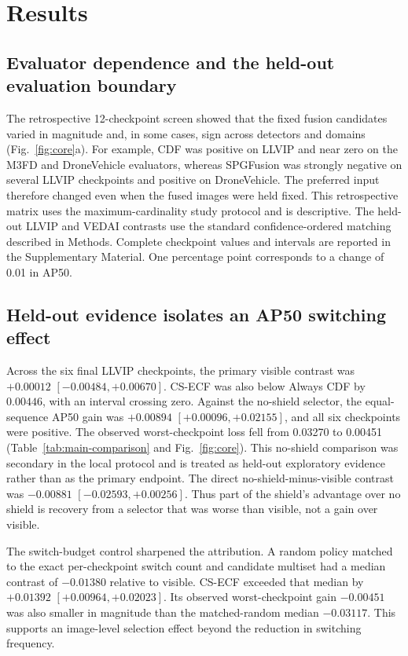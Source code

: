 \section{Results}

\subsection{Evaluator dependence and the held-out evaluation boundary}

The retrospective 12-checkpoint screen showed that the fixed fusion candidates
varied in magnitude and, in some cases, sign across detectors and domains
(Fig.~\ref{fig:core}a). For example, CDF was positive on LLVIP and near zero on
the M3FD and DroneVehicle evaluators, whereas SPGFusion was strongly negative
on several LLVIP checkpoints and positive on DroneVehicle. The preferred input
therefore changed even when the fused images were held fixed. This retrospective
matrix uses the maximum-cardinality study protocol and is descriptive. The
held-out LLVIP and VEDAI contrasts use the standard confidence-ordered matching
described in Methods. Complete checkpoint values and intervals are reported in the
Supplementary Material.
One percentage point corresponds to a change of 0.01 in AP50.

\subsection{Held-out evidence isolates an AP50 switching effect}

Across the six final LLVIP checkpoints, the primary visible contrast was
\(+0.00012\) \([-0.00484,+0.00670]\). CS-ECF was also below Always CDF by
\(0.00446\), with an interval crossing zero. Against the no-shield
selector, the equal-sequence AP50 gain was \(+0.00894\)
\([+0.00096,+0.02155]\), and all six checkpoints were positive. The observed
worst-checkpoint loss fell from 0.03270 to 0.00451
(Table~\ref{tab:main-comparison} and Fig.~\ref{fig:core}).
This no-shield comparison was secondary in the local protocol and is treated
as held-out exploratory evidence rather than as the primary endpoint.
The direct no-shield-minus-visible contrast was \(-0.00881\)
\([-0.02593,+0.00256]\). Thus part of the shield's advantage over no shield is
recovery from a selector that was worse than visible, not a gain over visible.

The switch-budget control sharpened the attribution. A random policy matched
to the exact per-checkpoint switch count and candidate multiset had a median
contrast of \(-0.01380\) relative to visible. CS-ECF exceeded that median by
\(+0.01392\) \([+0.00964,+0.02023]\). Its observed worst-checkpoint gain
\(-0.00451\) was also smaller in magnitude than the matched-random median
\(-0.03117\). This supports an image-level selection effect beyond the
reduction in switching frequency.

